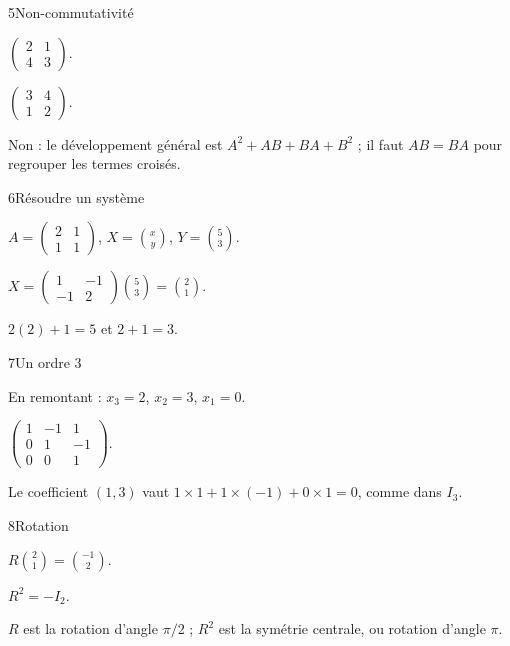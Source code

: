 \begin{corrige}{5}{Non-commutativité}
\begin{questions}
\item $\begin{pmatrix}2&1\\4&3\end{pmatrix}$.
\item $\begin{pmatrix}3&4\\1&2\end{pmatrix}$.
\item Non : le développement général est $A^2+AB+BA+B^2$ ; il faut $AB=BA$ pour regrouper les termes croisés.
\end{questions}
\end{corrige}
\begin{corrige}{6}{Résoudre un système}
\begin{questions}
\item $A=\begin{pmatrix}2&1\\1&1\end{pmatrix}$, $X=\binom xy$, $Y=\binom53$.
\item $X=\begin{pmatrix}1&-1\\-1&2\end{pmatrix}\binom53=\binom21$.
\item $2(2)+1=5$ et $2+1=3$.
\end{questions}
\end{corrige}
\begin{corrige}{7}{Un ordre $3$}
\begin{questions}
\item En remontant : $x_3=2$, $x_2=3$, $x_1=0$.
\item $\begin{pmatrix}1&-1&1\\0&1&-1\\0&0&1\end{pmatrix}$.
\item Le coefficient $(1,3)$ vaut $1\times1+1\times(-1)+0\times1=0$, comme dans $I_3$.
\end{questions}
\end{corrige}
\begin{corrige}{8}{Rotation}
\begin{questions}
\item $R\binom21=\binom{-1}2$.
\item $R^2=-I_2$.
\item $R$ est la rotation d’angle $\pi/2$ ; $R^2$ est la symétrie centrale, ou rotation d’angle $\pi$.
\end{questions}
\end{corrige}
